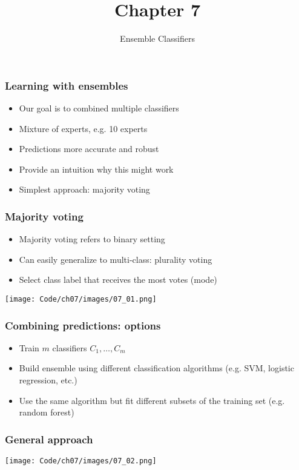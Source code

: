 \documentclass{beamer}
\title{Chapter 7}
\subtitle{Ensemble Classifiers}
\begin{document}
\maketitle

\begin{frame}
  \frametitle{Learning with ensembles}
  \begin{itemize}
  \item Our goal is to combined multiple classifiers
  \item Mixture of experts, e.g. 10 experts
  \item Predictions more accurate and robust
  \item Provide an intuition why this might work
  \item Simplest approach: majority voting
  \end{itemize}
\end{frame}

\begin{frame}
  \frametitle{Majority voting}
  \begin{itemize}
  \item Majority voting refers to binary setting
  \item Can easily generalize to multi-class: plurality voting
  \item Select class label that receives the most votes (mode)
  \end{itemize}
  \vspace{0.2in}
  \center
  \texttt{[image: Code/ch07/images/07\_01.png]}
\end{frame}

\begin{frame}
  \frametitle{Combining predictions: options}
  \begin{itemize}
  \item Train $m$ classifiers $C_1,\dots,C_m$
  \item Build ensemble using different classification algorithms (e.g. SVM, logistic regression, etc.)
  \item Use the same algorithm but fit different subsets of the training set (e.g. random forest)
  \end{itemize}
\end{frame}

\begin{frame}
  \frametitle{General approach}
  \center
  \texttt{[image: Code/ch07/images/07\_02.png]}
\end{frame}
\end{document}
